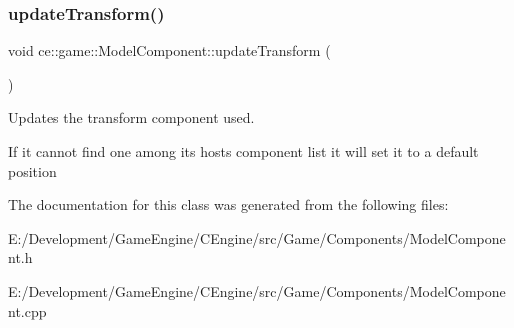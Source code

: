 \mbox{\label{classce_1_1game_1_1_model_component_a2a7c9d20e9cbeb2e2ad9c4bb3ffec73d}} 
\subsubsection{\texorpdfstring{update\+Transform()}{updateTransform()}}
{\footnotesize\ttfamily void ce\+::game\+::\+Model\+Component\+::update\+Transform (\begin{DoxyParamCaption}{ }\end{DoxyParamCaption})}



Updates the transform component used. 

If it cannot find one among it\textquotesingle{}s hosts component list it will set it to a default position 

The documentation for this class was generated from the following files\+:\begin{DoxyCompactItemize}
\item 
E\+:/\+Development/\+Game\+Engine/\+C\+Engine/src/\+Game/\+Components/Model\+Component.\+h\item 
E\+:/\+Development/\+Game\+Engine/\+C\+Engine/src/\+Game/\+Components/Model\+Component.\+cpp\end{DoxyCompactItemize}

